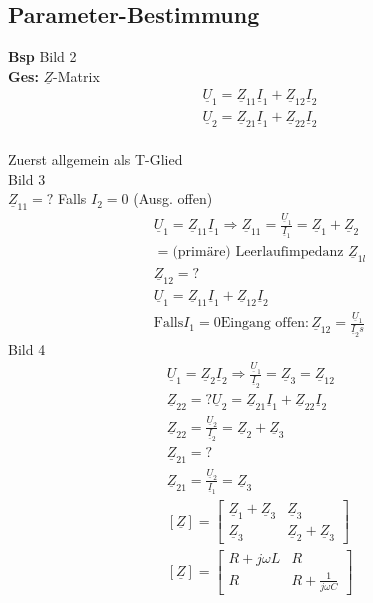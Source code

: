 \subsection{Parameter-Bestimmung}
\textbf{Bsp} Bild 2\\
\textbf{Ges:} $\underline{Z}$-Matrix\\
\begin{align}
	\underline{U}_1=\underline{Z}_{11}\underline{I}_1+\underline{Z}_{12}\underline{I}_2\nonumber\\
	\underline{U}_2=\underline{Z}_{21}\underline{I}_1+\underline{Z}_{22}\underline{I}_2\nonumber
	\end{align}\\
Zuerst allgemein als T-Glied\\
Bild 3\\
$\underline{Z}_{11}=?$
Falls $I_2=0$ (Ausg. offen)\\
\begin{align}
	\underline{U}_1=\underline{Z}_11\underline{I}_1 \Rightarrow
	\underline{Z}_{11}=\frac{\underline{U}_1}{\underline{I}_1}=\underline{Z}_1+\underline{Z}_2\nonumber\\
	=\text{(primäre) Leerlaufimpedanz }\underline{Z}_{1l}\nonumber\\
	\underline{Z}_{12}=?\nonumber\\
	\underline{U}_1=\underline{Z}_{11}\underline{I}_1+\underline{Z}_{12}\underline{I}_2\nonumber\\
	\text{Falls} I_1=0 \text{Eingang offen}:
	\underline{Z}_{12}=\frac{\underline{U}_1}{\underline{I}_2s}\nonumber
\end{align}
Bild 4\\
\begin{align}
	\underline{U}_1=\underline{Z}_2\underline{I}_2 \Rightarrow
	\frac{\underline{U}_1}{\underline{I}_2}=\underline{Z}_3=\underline{Z}_{12}\nonumber\\
	\underline{Z}_{22}=?
	\underline{U}_2=\underline{Z}_{21}\underline{I}_1+\underline{Z}_{22}\underline{I}_2\nonumber\\
	\underline{Z}_{22}=\frac{\underline{U}_2}{\underline{I}_2}=\underline{Z}_2+\underline{Z}_3\nonumber\\
	\underline{Z}_{21}=?\nonumber\\
	\underline{Z}_{21}=\frac{\underline{U}_2}{\underline{I}_1}=\underline{Z}_3\nonumber\\
	[\underline{Z}]=
	\begin{bmatrix}
		\underline{Z}_1+\underline{Z}_3 & \underline{Z}_3\\
		\underline{Z}_3 & \underline{Z}_2+\underline{Z}_3
	\end{bmatrix}\nonumber\\
	[\underline{Z}]=
	\begin{bmatrix}
		R+j\omega L & R\\
		R & R+\frac{1}{j\omega C}
	\end{bmatrix}\nonumber
\end{align}
